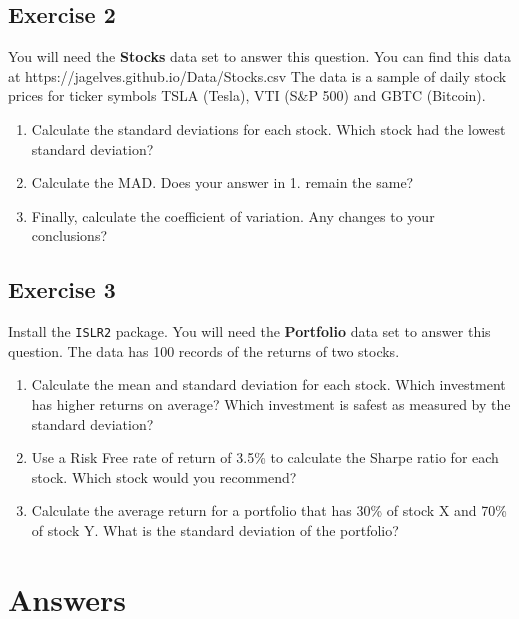 \documentclass[
  letterpaper,
  DIV=11,
  numbers=noendperiod]{scrreprt}
\providecommand{\tightlist}{%
  \setlength{\itemsep}{0pt}\setlength{\parskip}{0pt}}\usepackage{longtable,booktabs,array}
\begin{document}
\hypertarget{exercise-2-6}{%
\subsection*{Exercise 2}\label{exercise-2-6}}

You will need the \textbf{Stocks} data set to answer this question. You
can find this data at https://jagelves.github.io/Data/Stocks.csv The
data is a sample of daily stock prices for ticker symbols TSLA (Tesla),
VTI (S\&P 500) and GBTC (Bitcoin).

\begin{enumerate}
\def\labelenumi{\arabic{enumi}.}
\tightlist
\item
  Calculate the standard deviations for each stock. Which stock had the
  lowest standard deviation?
\item
  Calculate the MAD. Does your answer in 1. remain the same?
\item
  Finally, calculate the coefficient of variation. Any changes to your
  conclusions?
\end{enumerate}

\hypertarget{exercise-3-6}{%
\subsection*{Exercise 3}\label{exercise-3-6}}

Install the \texttt{ISLR2} package. You will need the \textbf{Portfolio}
data set to answer this question. The data has 100 records of the
returns of two stocks.

\begin{enumerate}
\def\labelenumi{\arabic{enumi}.}
\tightlist
\item
  Calculate the mean and standard deviation for each stock. Which
  investment has higher returns on average? Which investment is safest
  as measured by the standard deviation?
\item
  Use a Risk Free rate of return of 3.5\% to calculate the Sharpe ratio
  for each stock. Which stock would you recommend?
\item
  Calculate the average return for a portfolio that has 30\% of stock X
  and 70\% of stock Y. What is the standard deviation of the portfolio?
\end{enumerate}

\hypertarget{answers-3}{%
\section{Answers}\label{answers-3}}
\end{document}
